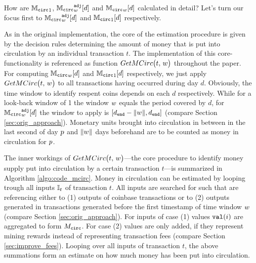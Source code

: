 How are \({\mathbb{M}_{\mathtt{circ}}}_{1}\), \( {{\mathbb{M}_{\mathtt{circ}}}^{\mathtt{adj}}_{{w}}}[d] \) and \( {{\mathbb{M}_{\mathtt{circ}}}_{{w}}}[d] \) calculated in detail? %
Let's turn our focus first to \({{\mathbb{M}_{\mathtt{circ}}}^{\mathtt{adj}}_{{w}}}[d]\) and \({\mathbb{M}_{\mathtt{circ}}}_{1}[d]\) respectively. %

As in the original implementation, the core of the estimation procedure is given by the decision rules determining the amount of money that is put into circulation by an individual transaction \(t\). %
The implementation of this core-functionality is referenced as function \(GetMCirc\bigl(t,\,{w} \bigr)\) throughout the paper. %
For computing \({{\mathbb{M}_{\mathtt{circ}}}_{{w}}}[d]\) and \({\mathbb{M}_{\mathtt{circ}}}_{1}[d]\) respectively, we just apply \(GetMCirc\bigl(t,\,{w} \bigr)\) to all transactions having occurred during day \(d\). %
Obviously, the time window to identify respent coins depends on each \(d\) respectively. %
While for a look-back window of 1 the window \({w}\) equals the period covered by \(d\), for \({{\mathbb{M}_{\mathtt{circ}}}^{\mathtt{adj}}_{{w}}}[d]\) the window to apply is \([d_{\mathtt{end}}-{\lVert w \rVert},d_{\mathtt{end}}]\) (compare Section \ref{sec:orig_approach}). %
Monetary units brought into circulation in between in the last second of day \({p}\) and \({\lVert w \rVert}\) days beforehand are to be counted as money in circulation for \({p}\). %

The inner workings of \(GetMCirc\bigl(t,\,{w} \bigr)\)---the core procedure to identify money supply put into circulation by a certain transaction \(t\)---is summarized in Algorithm \ref{algo:code_mcirc}.%
Money in circulation can be estimated by looping trough all inputs \({\mathbb{I}}_{t}\) of transaction \(t\). %
All inputs are searched for such that are referencing either to (1) outputs of coinbase transactions or to (2) outputs generated in transactions generated before the first timestamp of time window \({w}\) (compare Section \ref{sec:orig_approach}). %
For inputs of case (1) values \({\mathtt{val}}(i)\) are aggregated to form \({M_{\mathtt{circ}}}\). %
For case (2) values are only added, if they represent mining rewards instead of representing transaction fees (compare Section \ref{sec:improve_fees}). %
Looping over all inputs of transaction \(t\), the above summations form an estimate on how much money has been put into circulation. %

